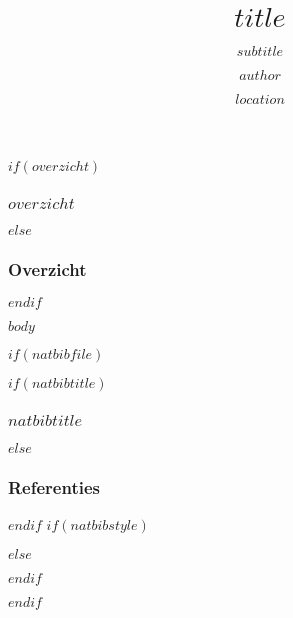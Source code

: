 \documentclass[$fontsize$, xetex]{beamer}
\title{$title$}
\subtitle{$subtitle$}
\author{$author$}
\institute{$institute$}
\date{$location$}
\date{}
\begin{document}
\begin{frame}[plain]
  \titlepage
\end{frame}

\begin{frame}
$if(overzicht)$
  \frametitle{$overzicht$}
$else$
  \frametitle{Overzicht}
$endif$
	\tableofcontents
\end{frame}

$body$

$if(natbibfile)$
\begin{frame}
$if(natbibtitle)$
\frametitle{$natbibtitle$}
$else$
\frametitle{Referenties}
$endif$
$if(natbibstyle)$

$else$

$endif$
  
\end{frame}
$endif$
\end{document}
